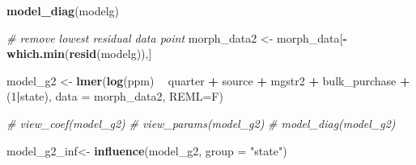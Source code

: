 \documentclass[
  11pt,
]{article}
\newenvironment{Shaded}{\begin{snugshade}}{\end{snugshade}}
\newcommand{\CommentTok}[1]{\textcolor[rgb]{0.56,0.35,0.01}{\textit{#1}}}
\newcommand{\DataTypeTok}[1]{\textcolor[rgb]{0.13,0.29,0.53}{#1}}
\newcommand{\DecValTok}[1]{\textcolor[rgb]{0.00,0.00,0.81}{#1}}
\newcommand{\KeywordTok}[1]{\textcolor[rgb]{0.13,0.29,0.53}{\textbf{#1}}}
\newcommand{\NormalTok}[1]{#1}
\newcommand{\OperatorTok}[1]{\textcolor[rgb]{0.81,0.36,0.00}{\textbf{#1}}}
\newcommand{\StringTok}[1]{\textcolor[rgb]{0.31,0.60,0.02}{#1}}
\begin{document}
\begin{Shaded}
\begin{Highlighting}[]
\KeywordTok{model_diag}\NormalTok{(modelg)}
\end{Highlighting}
\end{Shaded}

\begin{Shaded}
\begin{Highlighting}[]
\CommentTok{# remove lowest residual data point}
\NormalTok{morph_data2 <-}\StringTok{ }\NormalTok{morph_data[}\OperatorTok{-}\KeywordTok{which.min}\NormalTok{(}\KeywordTok{resid}\NormalTok{(modelg)),]}


\NormalTok{model_g2 <-}\StringTok{ }\KeywordTok{lmer}\NormalTok{(}\KeywordTok{log}\NormalTok{(ppm) }\OperatorTok{~}\StringTok{  }\NormalTok{quarter }\OperatorTok{+}\StringTok{ }\NormalTok{source }\OperatorTok{+}\StringTok{ }\NormalTok{mgstr2 }\OperatorTok{+}\StringTok{ }\NormalTok{bulk_purchase }\OperatorTok{+}\StringTok{ }
\StringTok{                   }\NormalTok{(}\DecValTok{1}\OperatorTok{|}\NormalTok{state), }\DataTypeTok{data =}\NormalTok{ morph_data2, }\DataTypeTok{REML=}\NormalTok{F)}


\CommentTok{# view_coef(model_g2)}
\CommentTok{# view_params(model_g2)}
\CommentTok{# model_diag(model_g2)}
\end{Highlighting}
\end{Shaded}

\begin{Shaded}
\begin{Highlighting}[]
\NormalTok{model_g2_inf<-}\StringTok{ }\KeywordTok{influence}\NormalTok{(model_g2, }\DataTypeTok{group =} \StringTok{"state"}\NormalTok{)}
\end{Highlighting}
\end{Shaded}
\end{document}
